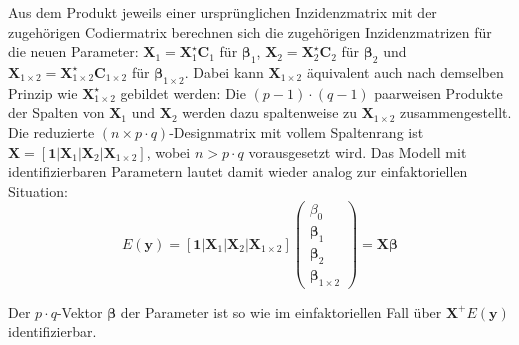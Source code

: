Aus dem Produkt jeweils einer ursprünglichen Inzidenzmatrix mit der zugehörigen Codiermatrix berechnen sich die zugehörigen Inzidenzmatrizen für die neuen Parameter: $\bm{X}_{1} = \bm{X}_{1}^{\star} \bm{C}_{1}$ für $\bm{\beta}_{1}$, $\bm{X}_{2} = \bm{X}_{2}^{\star} \bm{C}_{2}$ für $\bm{\beta}_{2}$ und $\bm{X}_{1 \times 2} = \bm{X}_{1 \times 2}^{\star} \bm{C}_{1 \times 2}$ für $\bm{\beta}_{1 \times 2}$. Dabei kann $\bm{X}_{1 \times 2}$ äquivalent auch nach demselben Prinzip wie $\bm{X}_{1 \times 2}^{\star}$ gebildet werden: Die $(p-1) \cdot (q-1)$ paarweisen Produkte der Spalten von $\bm{X}_{1}$ und $\bm{X}_{2}$ werden dazu spaltenweise zu $\bm{X}_{1 \times 2}$ zusammengestellt. Die reduzierte $(n \times p \cdot q)$-Designmatrix mit vollem Spaltenrang ist $\bm{X} = [\bm{1} | \bm{X}_{1} | \bm{X}_{2} | \bm{X}_{1 \times 2}]$, wobei $n > p \cdot q$ vorausgesetzt wird. Das Modell mit identifizierbaren Parametern lautet damit wieder analog zur einfaktoriellen Situation:
\begin{equation*}
E(\bm{y}) = [\bm{1} | \bm{X}_{1} | \bm{X}_{2} | \bm{X}_{1 \times 2}] \left(\begin{array}{l} \beta_{0} \\ \bm{\beta}_{1} \\ \bm{\beta}_{2} \\ \bm{\beta}_{1 \times 2} \end{array}\right) = \bm{X} \bm{\beta}
\end{equation*}

Der $p \cdot q$-Vektor $\bm{\beta}$ der Parameter ist so wie im einfaktoriellen Fall über $\bm{X}^{+} E(\bm{y})$ identifizierbar.

